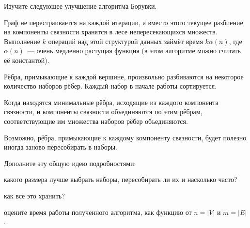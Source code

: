Изучите следующее улучшение алгоритма Борувки.
\begin{itemtask}
    \item Граф не перестраивается на каждой итерации, а вместо этого текущее разбиение на компоненты
        связности хранятся в лесе непересекающихся множеств. Выполнение $k$ операций над этой структурой
        данных займёт время $k \alpha(n)$, где $\alpha(n)$~--- очень медленно растущая функция (в этом
        алгоритме можно считать её константой).
    \item Рёбра, примыкающие к каждой вершине, произвольно разбиваются на некоторое количество наборов
        рёбер. Каждый набор в начале работы сортируется.
    \item Когда находятся минимальные рёбра, исходящие из каждого компонента связности, и компоненты
        связности объединяются по этим рёбрам, соответствующие им множества наборов рёбер объединяются.
    \item Возможно, рёбра, примыкающие к каждому компоненту связности, будет полезно иногда заново
        пересобирать в наборы.
\end{itemtask}
Дополните эту общую идею подробностями:
\begin{enumcyr}
    \item какого размера лучше выбрать наборы, пересобирать ли их и насколько часто?
    \item как всё это хранить?
    \item оцените время работы полученного алгоритма, как функцию от $n = |V|$ и $m = |E|$.
\end{enumcyr}

